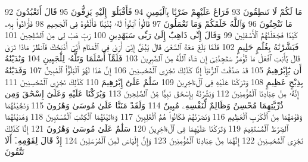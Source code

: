 {\tiny\colorbox{cl_aya}{92}} مَا لَكُمْ لَا تَنطِقُونَ
{\tiny\colorbox{cl_aya}{93}} فَرَاغَ عَلَيْهِمْ ضَرْبًۢا بِٱلْيَمِينِ
{\tiny\colorbox{cl_aya}{94}} فَأَقْبَلُوٓا۟ إِلَيْهِ يَزِفُّونَ
{\tiny\colorbox{cl_aya}{95}} قَالَ أَتَعْبُدُونَ مَا تَنْحِتُونَ
{\tiny\colorbox{cl_aya}{96}} وَٱللَّهُ خَلَقَكُمْ وَمَا تَعْمَلُونَ
{\tiny\colorbox{cl_aya}{97}} قَالُوا۟ ٱبْنُوا۟ لَهُۥ بُنْيَٰنًا فَأَلْقُوهُ فِى ٱلْجَحِيمِ
{\tiny\colorbox{cl_aya}{98}} فَأَرَادُوا۟ بِهِۦ كَيْدًا فَجَعَلْنَٰهُمُ ٱلْأَسْفَلِينَ
{\tiny\colorbox{cl_aya}{99}} وَقَالَ إِنِّى ذَاهِبٌ إِلَىٰ رَبِّى سَيَهْدِينِ
{\tiny\colorbox{cl_aya}{100}} رَبِّ هَبْ لِى مِنَ ٱلصَّٰلِحِينَ
{\tiny\colorbox{cl_aya}{101}} فَبَشَّرْنَٰهُ بِغُلَٰمٍ حَلِيمٍ
{\tiny\colorbox{cl_aya}{102}} فَلَمَّا بَلَغَ مَعَهُ ٱلسَّعْىَ قَالَ يَٰبُنَىَّ إِنِّىٓ أَرَىٰ فِى ٱلْمَنَامِ أَنِّىٓ أَذْبَحُكَ فَٱنظُرْ مَاذَا تَرَىٰ قَالَ يَٰٓأَبَتِ ٱفْعَلْ مَا تُؤْمَرُ سَتَجِدُنِىٓ إِن شَآءَ ٱللَّهُ مِنَ ٱلصَّٰبِرِينَ
{\tiny\colorbox{cl_aya}{103}} فَلَمَّآ أَسْلَمَا وَتَلَّهُۥ لِلْجَبِينِ
{\tiny\colorbox{cl_aya}{104}} وَنَٰدَيْنَٰهُ أَن يَٰٓإِبْرَٰهِيمُ
{\tiny\colorbox{cl_aya}{105}} قَدْ صَدَّقْتَ ٱلرُّءْيَآ إِنَّا كَذَٰلِكَ نَجْزِى ٱلْمُحْسِنِينَ
{\tiny\colorbox{cl_aya}{106}} إِنَّ هَٰذَا لَهُوَ ٱلْبَلَٰٓؤُا۟ ٱلْمُبِينُ
{\tiny\colorbox{cl_aya}{107}} وَفَدَيْنَٰهُ بِذِبْحٍ عَظِيمٍ
{\tiny\colorbox{cl_aya}{108}} وَتَرَكْنَا عَلَيْهِ فِى ٱلْءَاخِرِينَ
{\tiny\colorbox{cl_aya}{109}} سَلَٰمٌ عَلَىٰٓ إِبْرَٰهِيمَ
{\tiny\colorbox{cl_aya}{110}} كَذَٰلِكَ نَجْزِى ٱلْمُحْسِنِينَ
{\tiny\colorbox{cl_aya}{111}} إِنَّهُۥ مِنْ عِبَادِنَا ٱلْمُؤْمِنِينَ
{\tiny\colorbox{cl_aya}{112}} وَبَشَّرْنَٰهُ بِإِسْحَٰقَ نَبِيًّا مِّنَ ٱلصَّٰلِحِينَ
{\tiny\colorbox{cl_aya}{113}} وَبَٰرَكْنَا عَلَيْهِ وَعَلَىٰٓ إِسْحَٰقَ وَمِن ذُرِّيَّتِهِمَا مُحْسِنٌ وَظَالِمٌ لِّنَفْسِهِۦ مُبِينٌ
{\tiny\colorbox{cl_aya}{114}} وَلَقَدْ مَنَنَّا عَلَىٰ مُوسَىٰ وَهَٰرُونَ
{\tiny\colorbox{cl_aya}{115}} وَنَجَّيْنَٰهُمَا وَقَوْمَهُمَا مِنَ ٱلْكَرْبِ ٱلْعَظِيمِ
{\tiny\colorbox{cl_aya}{116}} وَنَصَرْنَٰهُمْ فَكَانُوا۟ هُمُ ٱلْغَٰلِبِينَ
{\tiny\colorbox{cl_aya}{117}} وَءَاتَيْنَٰهُمَا ٱلْكِتَٰبَ ٱلْمُسْتَبِينَ
{\tiny\colorbox{cl_aya}{118}} وَهَدَيْنَٰهُمَا ٱلصِّرَٰطَ ٱلْمُسْتَقِيمَ
{\tiny\colorbox{cl_aya}{119}} وَتَرَكْنَا عَلَيْهِمَا فِى ٱلْءَاخِرِينَ
{\tiny\colorbox{cl_aya}{120}} سَلَٰمٌ عَلَىٰ مُوسَىٰ وَهَٰرُونَ
{\tiny\colorbox{cl_aya}{121}} إِنَّا كَذَٰلِكَ نَجْزِى ٱلْمُحْسِنِينَ
{\tiny\colorbox{cl_aya}{122}} إِنَّهُمَا مِنْ عِبَادِنَا ٱلْمُؤْمِنِينَ
{\tiny\colorbox{cl_aya}{123}} وَإِنَّ إِلْيَاسَ لَمِنَ ٱلْمُرْسَلِينَ
{\tiny\colorbox{cl_aya}{124}} إِذْ قَالَ لِقَوْمِهِۦٓ أَلَا تَتَّقُونَ
